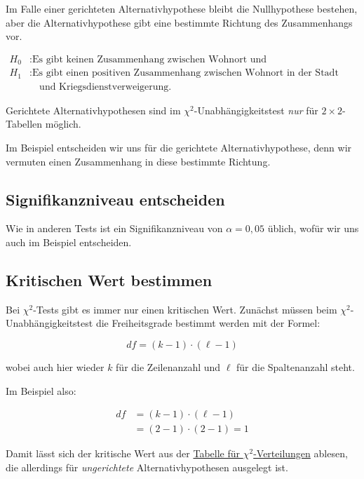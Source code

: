 \documentclass[
  11pt,
  ngerman,
  a4paper,
]{report}
\begin{document}
Im Falle einer gerichteten Alternativhypothese bleibt die Nullhypothese bestehen, aber die Alternativhypothese gibt eine bestimmte Richtung des Zusammenhangs vor.

\[
\begin{aligned}
H_0 &: \textrm{Es gibt keinen Zusammenhang zwischen Wohnort und Verweigerungsentscheidung.}\\
H_1 &: \textrm{Es gibt einen positiven Zusammenhang zwischen Wohnort in der Stadt} \\
&\quad\textrm{und Kriegsdienstverweigerung.}
\end{aligned}
\]

Gerichtete Alternativhypothesen sind im \(\chi^2\)-Unabhängigkeitstest \emph{nur} für \(2\times2\)-Tabellen möglich.

Im Beispiel entscheiden wir uns für die gerichtete Alternativhypothese, denn wir vermuten einen Zusammenhang in diese bestimmte Richtung.

\hypertarget{signifikanzniveau-entscheiden-4}{%
\subsection{Signifikanzniveau entscheiden}\label{signifikanzniveau-entscheiden-4}}

Wie in anderen Tests ist ein Signifikanzniveau von \(\alpha=0{,}05\) üblich, wofür wir uns auch im Beispiel entscheiden.

\hypertarget{kritischen-wert-bestimmen}{%
\subsection{Kritischen Wert bestimmen}\label{kritischen-wert-bestimmen}}

Bei \(\chi^2\)-Tests gibt es immer nur einen kritischen Wert. Zunächst müssen beim \(\chi^2\)-Unabhängigkeitstest die Freiheitsgrade bestimmt werden mit der Formel:

\[
\mathit{df} = (k - 1) \cdot (\ell - 1)
\label{eq:dfu}
\]

wobei auch hier wieder \(k\) für die Zeilenanzahl und \(\ell\) für die Spaltenanzahl steht.

Im Beispiel also:

\[
\begin{aligned}
\mathit{df} &= (k - 1) \cdot (\ell - 1)\\
&=(2-1)\cdot (2 - 1) = 1
\end{aligned}
\]

Damit lässt sich der kritische Wert aus der \protect\hyperlink{tabelle-chisq}{Tabelle für \(\chi^2\)-Verteilungen} ablesen, die allerdings für \emph{ungerichtete} Alternativhypothesen ausgelegt ist.
\end{document}
